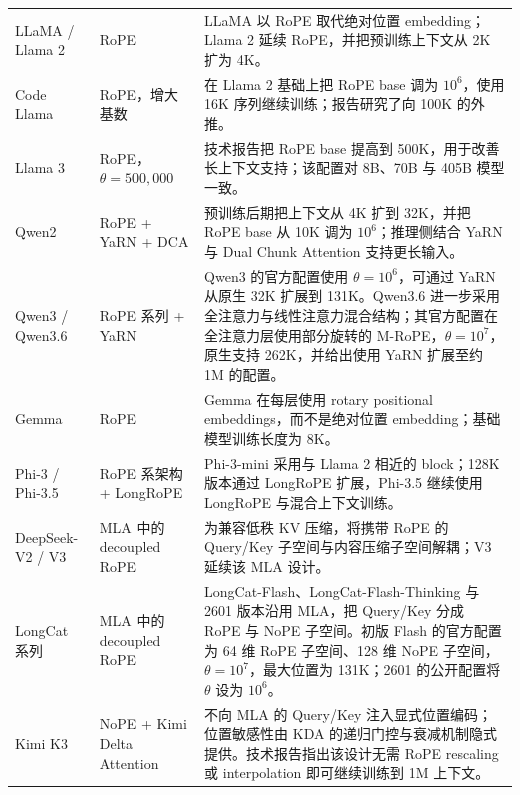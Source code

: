 \documentclass[UTF8,fontset=none,a4paper,10pt]{ctexart}
\begin{document}
\begin{longtable}{@{}p{2.7cm}p{3.6cm}p{8.0cm}@{}}
LLaMA / Llama 2 & RoPE & LLaMA 以 RoPE 取代绝对位置 embedding；Llama 2 延续 RoPE，并把预训练上下文从 2K 扩为 4K\cite{touvron2023llama,touvron2023llama2}。\\

Code Llama & RoPE，增大基数 & 在 Llama 2 基础上把 RoPE base 调为 $10^6$，使用 16K 序列继续训练；报告研究了向 100K 的外推\cite{roziere2023codellama}。\\

Llama 3 & RoPE，$\theta=500{,}000$ & 技术报告把 RoPE base 提高到 500K，用于改善长上下文支持；该配置对 8B、70B 与 405B 模型一致\cite{dubey2024llama3}。\\

Qwen2 & RoPE + YaRN + DCA & 预训练后期把上下文从 4K 扩到 32K，并把 RoPE base 从 10K 调为 $10^6$；推理侧结合 YaRN 与 Dual Chunk Attention 支持更长输入\cite{yang2024qwen2}。\\

Qwen3 / Qwen3.6 & RoPE 系列 + YaRN & Qwen3 的官方配置使用 $\theta=10^6$，可通过 YaRN 从原生 32K 扩展到 131K\cite{yang2025qwen3}。Qwen3.6 进一步采用全注意力与线性注意力混合结构；其官方配置在全注意力层使用部分旋转的 M-RoPE，$\theta=10^7$，原生支持 262K，并给出使用 YaRN 扩展至约 1M 的配置\cite{qwen36config}。\\

Gemma & RoPE & Gemma 在每层使用 rotary positional embeddings，而不是绝对位置 embedding；基础模型训练长度为 8K\cite{gemmateam2024}。\\

Phi-3 / Phi-3.5 & RoPE 系架构 + LongRoPE & Phi-3-mini 采用与 Llama 2 相近的 block；128K 版本通过 LongRoPE 扩展，Phi-3.5 继续使用 LongRoPE 与混合上下文训练\cite{abdin2024phi3}。\\

DeepSeek-V2 / V3 & MLA 中的 decoupled RoPE & 为兼容低秩 KV 压缩，将携带 RoPE 的 Query/Key 子空间与内容压缩子空间解耦；V3 延续该 MLA 设计\cite{deepseek2024v2,deepseek2024v3}。\\

LongCat 系列 & MLA 中的 decoupled RoPE & LongCat-Flash、LongCat-Flash-Thinking 与 2601 版本沿用 MLA，把 Query/Key 分成 RoPE 与 NoPE 子空间。初版 Flash 的官方配置为 64 维 RoPE 子空间、128 维 NoPE 子空间，$\theta=10^7$，最大位置为 131K；2601 的公开配置将 $\theta$ 设为 $10^6$\cite{longcatflash,longcatthinking2601,longcatconfigs}。\\

Kimi K3 & NoPE + Kimi Delta Attention & 不向 MLA 的 Query/Key 注入显式位置编码；位置敏感性由 KDA 的递归门控与衰减机制隐式提供。技术报告指出该设计无需 RoPE rescaling 或 interpolation 即可继续训练到 1M 上下文\cite{kimik3}。\\


\end{longtable}
\end{document}
